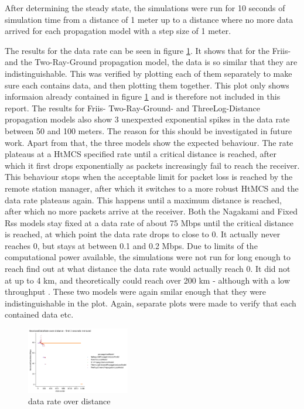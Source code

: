 After determining the steady state, the simulations were run for 10 seconds of simulation time from a distance of 1 meter 
up to a distance where no more data arrived for each propagation model with a step size of 1 meter.

The results for the data rate can be seen in figure \ref{fig:drOverDistance}.
It shows that for the Friis- and the Two-Ray-Ground propagation model, the data is so similar that they are indistinguishable.
This was verified by plotting each of them separately to make sure each contains data, and then plotting them together. This plot only
shows informaion already contained in figure \ref{fig:drOverDistance} and is therefore not included in this report.
The results for Friis- Two-Ray-Ground- and ThreeLog-Distance propagation models also show 3 unexpexted exponential spikes
in the data rate between 50 and 100 meters. The reason for this should be  investigated in future work.
Apart from that, the three models show the expected behaviour. The rate plateaus at a HtMCS specified rate until a 
critical distance is reached, after which it first drops exponentially as packets increasingly fail to reach the receiver. 
This behaviour stops when the acceptable limit for packet loss is reached by the remote station manager, after which it 
switches to a more robust HtMCS and the data rate plateaus again. This happens until a maximum distance is reached, after which
no more packets arrive at the receiver. 
Both the Nagakami and Fixed Rss models stay fixed at a data rate of about 75 Mbps until the critical distance is reached,
at which point the data rate drops to close to 0. It actually never reaches 0, but stays at between 0.1 and 0.2 Mbps. Due to 
limits of the computational power available, the simulations were not run for long enough to reach find out at what distance
the data rate would actually reach 0. It did not at up to 4 km, and theoretically could reach over 200 km - 
although with a low throughput \cite{inproceedings}.  These two models were again smilar enough that they were
indistinguishable in the plot. Again, separate plots were made to verify that each contained data etc.
\begin{figure}[ht]
    \centering
    \includegraphics[width=0.4\textwidth]{../DataAnalysis/results/data_rate_comp.png}
    \caption{data rate over distance}
    \label{fig:drOverDistance}
\end{figure}

